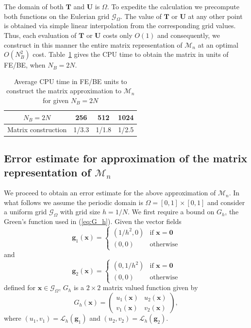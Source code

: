 \documentclass[preprint,12pt]{elsarticle}
\begin{document}
The domain of both $\mathbf{T}$ and $\mathbf{U}$ is $\Omega$. To expedite the calculation we precompute both functions on the Eulerian grid $\mathcal{G}_\Omega$. The value of $\mathbf{T}$ or $\mathbf{U}$ at any other point is obtained via simple linear
interpolation from the corresponding grid values. Thus, each evaluation of $\mathbf{T}$ or $\mathbf{U}$  costs only $O(1)$  and consequently, we construct in 
this manner  the entire matrix representation of $\mathcal{M}_n$ at an optimal $O(N_B^2)$ cost.
Table~\ref{Table:MConstruct} gives the CPU time to obtain the matrix in units of FE/BE, when $N_B=2N$. 
\begin{table}
\begin{center}
\begin{tabular}{|c|c c c|}
\hline
$N_B=2N$ &  256  & 512 & 1024 \\
\hline
\textrm{Matrix construction} 
& 1/3.3  & 1/1.8 &  1/2.5 \\
\hline
\end{tabular}
\end{center}
\caption{Average CPU time in FE/BE units to construct the matrix approximation to $\mathcal{M}_n$ for given $N_B=2N$}
\label{Table:MConstruct}
\end{table}

\subsection{Error estimate for approximation of the matrix representation of $\mathcal{M}_n$}
We proceed to obtain an error estimate for the above approximation of $\mathcal{M}_n$. In what follows we assume the periodic domain is $\Omega = [0,1]\times[0,1]$ and consider a uniform grid $\mathcal{G}_\Omega$ with grid size $h=1/N$. 
We first require a bound on $G_h$, the Green's function used in (\ref{eq:G_h}). 
Given the vector fields
\begin{equation}
\mathbf{g}_1(\mathbf{x}) = \begin{cases}
(1/h^2,0)& \textrm{if } \mathbf{x} = \mathbf{0} \\
(0,0)& \textrm{otherwise}
\end{cases}
\end{equation}
and
\begin{equation}
\mathbf{g}_2(\mathbf{x}) = \begin{cases}
(0,1/h^2)& \textrm{if } \mathbf{x} = \mathbf{0} \\
(0,0)& \textrm{otherwise}
\end{cases}
\end{equation}
defined for $\mathbf{x} \in \mathcal{G}_\Omega$, 
$G_h$ is a $2\times 2$ matrix valued function given by
\begin{equation}
G_h(\mathbf{x})=
\left( \begin{array}{cc}
u_1(\mathbf{x}) & u_2(\mathbf{x}) \\
v_1(\mathbf{x}) & v_2(\mathbf{x})
\end{array} \right),\label{eq:G_hDef}
\end{equation}
where $(u_1,v_1) = \mathcal{L}_h(\mathbf{g}_1)$ and $(u_2,v_2) = \mathcal{L}_h(\mathbf{g}_2)$.
\end{document}
